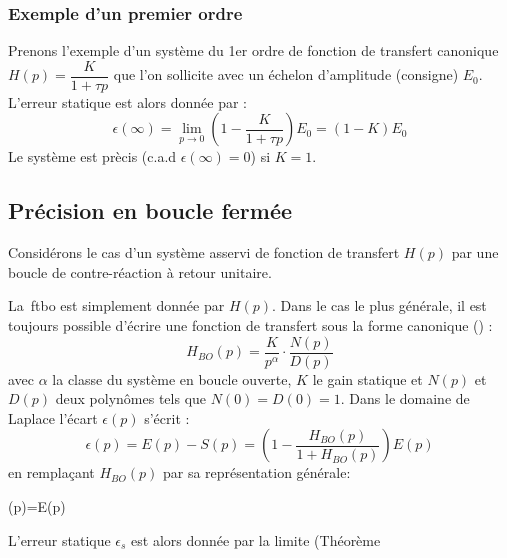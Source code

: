 \subsubsection{Exemple d'un premier ordre}
Prenons l'exemple d'un système du 1er ordre de fonction de transfert canonique 
$H(p)=\dfrac{K}{1+\tau p}$ que l'on sollicite avec un échelon 
d'amplitude (consigne) $E_0$.
L'erreur statique est alors donnée par :
\[
\epsilon(\infty)=\lim\limits_{p\to 0}\left(1-\dfrac{K}{1+\tau p}\right)E_0
                =(1-K)E_0
\]
Le système est prècis (c.a.d $\epsilon(\infty)=0$) si $K=1$. 
\subsection{Précision en boucle fermée}
Considérons le cas d'un système asservi de fonction de transfert $H(p)$
par une boucle de contre-réaction à retour unitaire.
\begin{center}
    
\end{center}
La~\gls{ftbo} est simplement donnée par $H(p)$. Dans le cas le plus
générale, il est toujours possible d'écrire une fonction de transfert
sous la forme canonique () :
\[
H_{BO}(p)=\dfrac{K}{p^\alpha}\cdot\dfrac{N(p)}{D(p)}
\]
avec $\alpha$ la classe du système en boucle ouverte, $K$ le gain statique et 
$N(p)$ et $D(p)$ deux polynômes tels que $N(0)=D(0)=1$. 
Dans le domaine de Laplace l'écart $\epsilon(p)$ s'écrit :
\[
\epsilon(p)=E(p)-S(p)=\left(1-\dfrac{H_{BO}(p)}{1+H_{BO}(p)}\right)E(p)
\]
en remplaçant $H_{BO}(p)$ par sa représentation générale:
\begin{bequation}
    \epsilon(p)=E(p)
\end{bequation}
L'erreur statique $\epsilon_s$ est alors donnée par la limite (Théorème 
